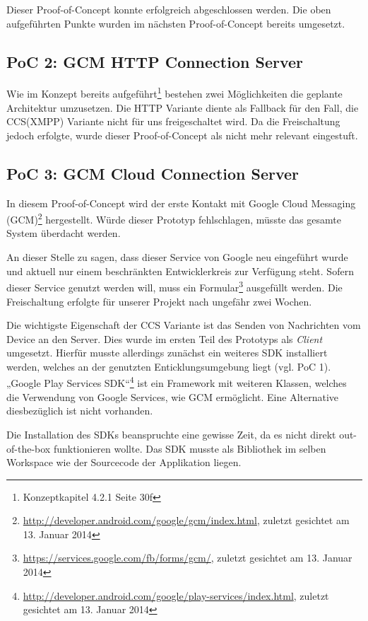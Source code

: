 Dieser Proof-of-Concept konnte erfolgreich abgeschlossen werden. Die oben aufgeführten Punkte wurden im nächsten Proof-of-Concept bereits umgesetzt.

\subsection{PoC 2: GCM HTTP Connection Server}

Wie im Konzept bereits aufgeführt\footnote{Konzeptkapitel 4.2.1 Seite 30f} bestehen zwei Möglichkeiten die geplante Architektur umzusetzen. Die HTTP Variante diente als Fallback für den Fall, die CCS(XMPP) Variante nicht für uns freigeschaltet wird. Da die Freischaltung jedoch erfolgte, wurde dieser Proof-of-Concept als nicht mehr relevant eingestuft.

\subsection{PoC 3: GCM Cloud Connection Server}

In diesem Proof-of-Concept wird der erste Kontakt mit Google Cloud Messaging (GCM)\footnote{\url{http://developer.android.com/google/gcm/index.html}, zuletzt gesichtet am 13. Januar 2014} hergestellt. Würde dieser Prototyp fehlschlagen, müsste das gesamte System überdacht werden.

An dieser Stelle zu sagen, dass dieser Service von Google neu eingeführt wurde und aktuell nur einem beschränkten Entwicklerkreis zur Verfügung steht. Sofern dieser Service genutzt werden will, muss ein Formular\footnote{\url{https://services.google.com/fb/forms/gcm/}, zuletzt gesichtet am 13. Januar 2014} ausgefüllt werden. Die Freischaltung erfolgte für unserer Projekt nach ungefähr zwei Wochen.

Die wichtigste Eigenschaft der CCS Variante ist das Senden von Nachrichten vom Device an den Server. Dies wurde im ersten Teil des Prototyps als \textit{Client} umgesetzt. Hierfür musste allerdings zunächst ein weiteres SDK installiert werden, welches an der genutzten Enticklungsumgebung liegt (vgl. PoC 1). „Google Play Services SDK“\footnote{\url{http://developer.android.com/google/play-services/index.html}, zuletzt gesichtet am 13. Januar 2014} ist ein Framework mit weiteren Klassen, welches die Verwendung von Google Services, wie GCM ermöglicht. Eine Alternative diesbezüglich ist nicht vorhanden.

Die Installation des SDKs beanspruchte eine gewisse Zeit, da es nicht direkt out-of-the-box funktionieren wollte. Das SDK musste als Bibliothek im selben Workspace wie der Sourcecode der Applikation liegen.

